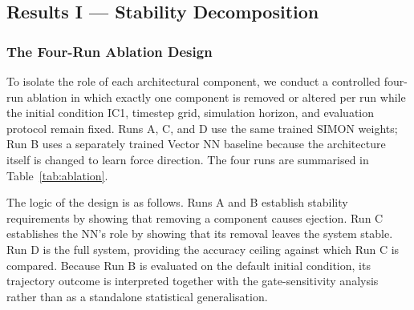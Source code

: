 \documentclass[12pt]{article}
\begin{document}
\subsection{Results I --- Stability Decomposition}
\label{sec:stability}

\subsubsection{The Four-Run Ablation Design}

To isolate the role of each architectural component, we conduct a controlled four-run
ablation in which exactly one component is removed or altered per run while the initial
condition IC1, timestep grid, simulation horizon, and evaluation protocol remain fixed. Runs
A, C, and D use the same trained SIMON weights; Run B uses a separately trained
Vector NN baseline because the architecture itself is changed to learn force direction.
The four runs are summarised in
Table~\ref{tab:ablation}.

\begin{table}[H]
\centering
\caption{Four-run ablation framework. Each run removes or replaces exactly one component.
Run D is the full SIMON system and serves as the reference configuration. All runs
use IC1 and $T = 100$ yr under the same evaluation protocol. Run A reports the
adaptive-off failure observed in the timestep-grid sweep, where $dt=0.01$ yr
produces ejection. Runs A, C, and D use the same SIMON weights; Run B uses a
separately trained Vector NN baseline because the force-direction architecture is
changed.}
\label{tab:ablation}
\end{table}

\noindent The logic of the design is as follows. Runs A and B establish stability requirements by
showing that removing a component causes ejection. Run C establishes the NN’s role by
showing that its removal leaves the system stable. Run D is the full system, providing
the accuracy ceiling against which Run C is compared. Because Run B is evaluated on the
default initial condition, its trajectory outcome is interpreted together with the
gate-sensitivity analysis rather than as a standalone statistical generalisation.
\end{document}
